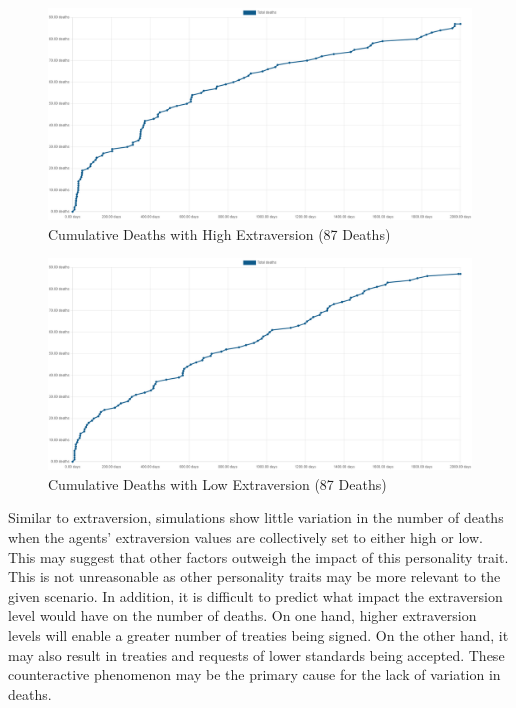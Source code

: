\begin{figure}[H]
    \begin{center}
        \includegraphics[scale=0.25]{Images/Cumulative Deaths, With Treaties, T7Only, 2000days, 20food, High extra, 87deaths.png}
    \end{center}
    \caption{Cumulative Deaths with High Extraversion (87 Deaths)}
    \label{fig: High Extraversion}
\end{figure}

\begin{figure}[H]
    \begin{center}
        \includegraphics[scale=0.25]{Images/Cumulative Deaths, With Treaties, T7Only, 2000days, 20food, Low extra, 87deaths.png}
    \end{center}
    \caption{Cumulative Deaths with Low Extraversion (87 Deaths)}
    \label{fig: Low Extraversion}
\end{figure}

Similar to extraversion, simulations show little variation in the number of deaths when the agents' extraversion values are collectively set to either high or low. This may suggest that other factors outweigh the impact of this personality trait. This is not unreasonable as other personality traits may be more relevant to the given scenario. In addition, it is difficult to predict what impact the extraversion level would have on the number of deaths. On one hand, higher extraversion levels will enable a greater number of treaties being signed. On the other hand, it may also result in treaties and requests of lower standards being accepted. These counteractive phenomenon may be the primary cause for the lack of variation in deaths.

